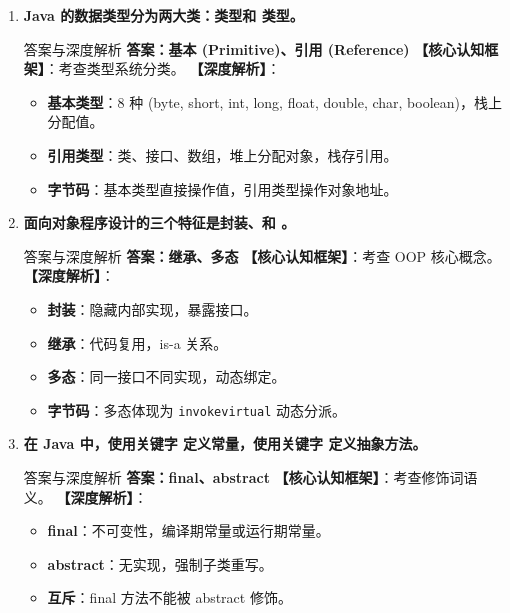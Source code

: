 \documentclass[12pt, a4paper]{ctexart}
\newcommand{\code}[1]{\texttt{\color{myblue}#1}}
\newcommand{\blank}{\underline{\hspace{2cm}}}
\begin{document}
\begin{enumerate}[label=\arabic*.]
	\item \textbf{Java 的数据类型分为两大类：\blank 类型和 \blank 类型。}
	      \begin{bluebox}{答案与深度解析}
		      \textbf{答案：基本 (Primitive)、引用 (Reference)}
		      \textbf{【核心认知框架】}：考查类型系统分类。
		      \textbf{【深度解析】}：
		      \begin{itemize}[leftmargin=*, nosep]
			      \item \textbf{基本类型}：8 种 (byte, short, int, long, float, double, char, boolean)，栈上分配值。
			      \item \textbf{引用类型}：类、接口、数组，堆上分配对象，栈存引用。
			      \item \textbf{字节码}：基本类型直接操作值，引用类型操作对象地址。
		      \end{itemize}
	      \end{bluebox}

	\item \textbf{面向对象程序设计的三个特征是封装、\blank 和 \blank。}
	      \begin{bluebox}{答案与深度解析}
		      \textbf{答案：继承、多态}
		      \textbf{【核心认知框架】}：考查 OOP 核心概念。
		      \textbf{【深度解析】}：
		      \begin{itemize}[leftmargin=*, nosep]
			      \item \textbf{封装}：隐藏内部实现，暴露接口。
			      \item \textbf{继承}：代码复用，is-a 关系。
			      \item \textbf{多态}：同一接口不同实现，动态绑定。
			      \item \textbf{字节码}：多态体现为 \code{invokevirtual} 动态分派。
		      \end{itemize}
	      \end{bluebox}

	\item \textbf{在 Java 中，使用关键字 \blank 定义常量，使用关键字 \blank 定义抽象方法。}
	      \begin{bluebox}{答案与深度解析}
		      \textbf{答案：final、abstract}
		      \textbf{【核心认知框架】}：考查修饰词语义。
		      \textbf{【深度解析】}：
		      \begin{itemize}[leftmargin=*, nosep]
			      \item \textbf{final}：不可变性，编译期常量或运行期常量。
			      \item \textbf{abstract}：无实现，强制子类重写。
			      \item \textbf{互斥}：final 方法不能被 abstract 修饰。
		      \end{itemize}
	      \end{bluebox}


\end{enumerate}
\end{document}
